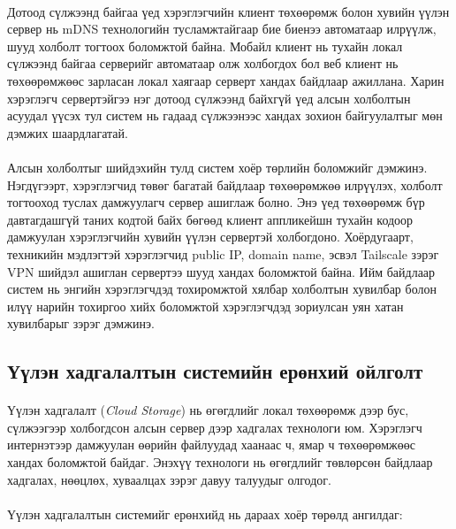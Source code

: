\paragraph{}
Дотоод сүлжээнд байгаа үед хэрэглэгчийн клиент төхөөрөмж болон хувийн үүлэн сервер нь mDNS технологийн тусламжтайгаар бие биенээ автоматаар илрүүлж, шууд холболт тогтоох боломжтой байна. Мобайл клиент нь тухайн локал сүлжээнд байгаа серверийг автоматаар олж холбогдох бол веб клиент нь төхөөрөмжөөс зарласан локал хаягаар серверт хандах байдлаар ажиллана. Харин хэрэглэгч сервертэйгээ нэг дотоод сүлжээнд байхгүй үед алсын холболтын асуудал үүсэх тул систем нь гадаад сүлжээнээс хандах зохион байгуулалтыг мөн дэмжих шаардлагатай.

\paragraph{}
Алсын холболтыг шийдэхийн тулд систем хоёр төрлийн боломжийг дэмжинэ. Нэгдүгээрт, хэрэглэгчид төвөг багатай байдлаар төхөөрөмжөө илрүүлэх, холболт тогтооход туслах дамжуулагч сервер ашиглаж болно. Энэ үед төхөөрөмж бүр давтагдашгүй таних кодтой байх бөгөөд клиент аппликейшн тухайн кодоор дамжуулан хэрэглэгчийн хувийн үүлэн сервертэй холбогдоно. Хоёрдугаарт, техникийн мэдлэгтэй хэрэглэгчид public IP, domain name, эсвэл Tailscale зэрэг VPN шийдэл ашиглан сервертээ шууд хандах боломжтой байна. Ийм байдлаар систем нь энгийн хэрэглэгчдэд тохиромжтой хялбар холболтын хувилбар болон илүү нарийн тохиргоо хийх боломжтой хэрэглэгчдэд зориулсан уян хатан хувилбарыг зэрэг дэмжинэ.
\subsection{Үүлэн хадгалалтын системийн ерөнхий ойлголт}

\paragraph{}
Үүлэн хадгалалт (\textit{Cloud Storage}) нь өгөгдлийг локал төхөөрөмж дээр бус, сүлжээгээр холбогдсон алсын сервер дээр хадгалах технологи юм. Хэрэглэгч интернэтээр дамжуулан өөрийн файлуудад хаанаас ч, ямар ч төхөөрөмжөөс хандах боломжтой байдаг. Энэхүү технологи нь өгөгдлийг төвлөрсөн байдлаар хадгалах, нөөцлөх, хуваалцах зэрэг давуу талуудыг олгодог.

\paragraph{}
Үүлэн хадгалалтын системийг ерөнхийд нь дараах хоёр төрөлд ангилдаг:

